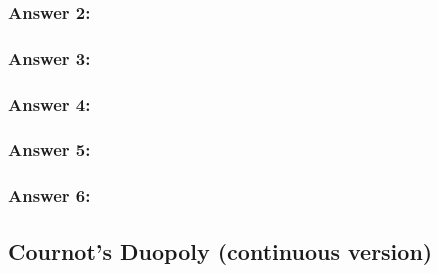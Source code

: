 \documentclass[11pt]{article}
\begin{document}
    \subsubsection{Answer 2:}

    \subsubsection{Answer 3:}

    \subsubsection{Answer 4:}

    \subsubsection{Answer 5:}

    \subsubsection{Answer 6:}

    \subsection{Cournot’s Duopoly (continuous version)}
\end{document}
